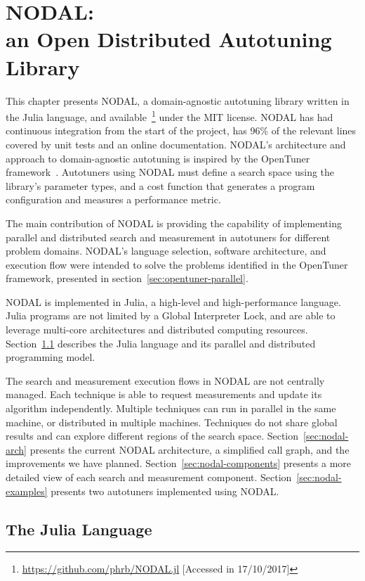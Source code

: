 \chapter[NODAL: an Open Distributed Autotuning Library]{NODAL: \\ an Open Distributed Autotuning Library}
\label{chap:julia}

This chapter presents NODAL, a domain-agnostic autotuning library written in
the Julia language, and
available~\footnote{\url{https://github.com/phrb/NODAL.jl} [Accessed in
17/10/2017]} under the MIT license.  NODAL has had continuous integration from
the start of the project, has 96\% of the relevant lines covered by unit tests
and an online documentation. NODAL's architecture and approach to
domain-agnostic autotuning is inspired by the OpenTuner
framework~\cite{ansel2014opentuner}. Autotuners using NODAL must define a
search space using the library's parameter types, and a cost function that
generates a program configuration and measures a performance metric.

The main contribution of NODAL is providing the capability of implementing
parallel and distributed search and measurement in autotuners for different
problem domains. NODAL's language selection, software architecture, and
execution flow were intended to solve the problems identified in the OpenTuner
framework, presented in section~\ref{sec:opentuner-parallel}.

NODAL is implemented in Julia, a high-level and high-performance language.
Julia programs are not limited by a Global Interpreter Lock, and are able to
leverage multi-core architectures and distributed computing resources.
Section~\ref{sec:julia} describes the Julia language and its parallel and
distributed programming model.

The search and measurement execution flows in NODAL are not centrally managed.
Each technique is able to request measurements and update its algorithm
independently. Multiple techniques can run in parallel in the same machine, or
distributed in multiple machines.  Techniques do not share global results and
can explore different regions of the search space.
Section~\ref{sec:nodal-arch} presents the current NODAL architecture, a
simplified call graph, and the improvements we have planned.
Section~\ref{sec:nodal-components} presents a more detailed view of each search
and measurement component.  Section~\ref{sec:nodal-examples} presents two
autotuners implemented using NODAL.

\section{The Julia Language}
\label{sec:julia}

